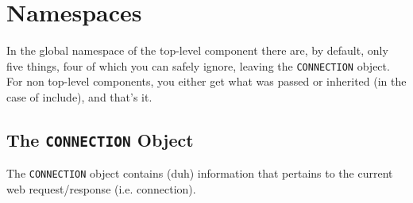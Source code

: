 \documentclass{manual}
\begin{document}
\chapter{Namespaces}
\label{namespaces}

In the global namespace of the top-level component there are, by
default, only five things, four of which you can safely ignore,
leaving the \texttt{CONNECTION} object.  For non top-level components,
you either get what was passed or inherited (in the case of include),
and that's it.


\section{The \texttt{CONNECTION} Object}
\label{connectionobj}

The \texttt{CONNECTION} object contains (duh) information that
pertains to the current web request/response (i.e. connection).
\end{document}
